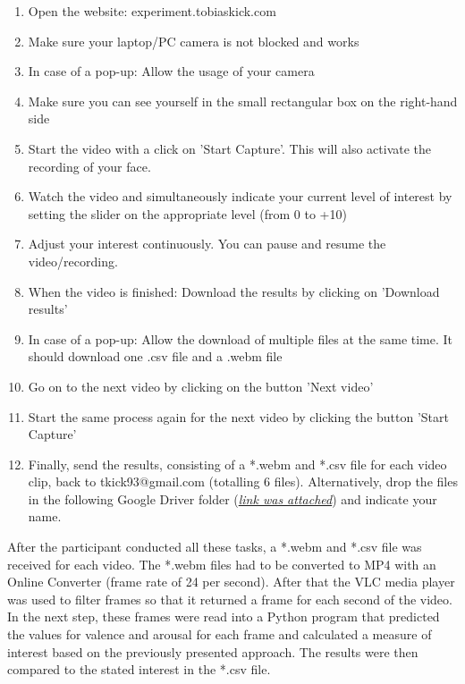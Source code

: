 \begin{enumerate}[noitemsep]
    \item Open the website: experiment.tobiaskick.com
    \item Make sure your laptop/PC camera is not blocked and works
    \item In case of a pop-up: Allow the usage of your camera
    \item Make sure you can see yourself in the small rectangular box on the right-hand side
    \item Start the video with a click on 'Start Capture'. This will also activate the recording of your face.
    \item Watch the video and simultaneously indicate your current level of interest by setting the slider on the appropriate level (from 0 to +10)
    \item Adjust your interest continuously. You can pause and resume the video/recording.
    \item When the video is finished: Download the results by clicking on 'Download results'
    \item In case of a pop-up: Allow the download of multiple files at the same time. It should download one .csv file and a .webm file
    \item Go on to the next video by clicking on the button 'Next video'
    \item Start the same process again for the next video by clicking the button 'Start Capture'
    \item Finally, send the results, consisting of a *.webm and *.csv file for each video clip, back to tkick93@gmail.com (totalling 6 files). Alternatively, drop the files in the following Google Driver folder (\emph{\underline{link was attached}}) and indicate your name.
\end{enumerate}

\noindent After the participant conducted all these tasks, a *.webm and *.csv file was received for each video. The *.webm files had to be converted to MP4 with an Online Converter (frame rate of 24 per second). After that the VLC media player was used to filter frames so that it returned a frame for each second of the video.
\newline\newline
In the next step, these frames were read into a Python program that predicted the values for valence and arousal for each frame and calculated a measure of interest based on the previously presented approach. The results were then compared to the stated interest in the *.csv file.


